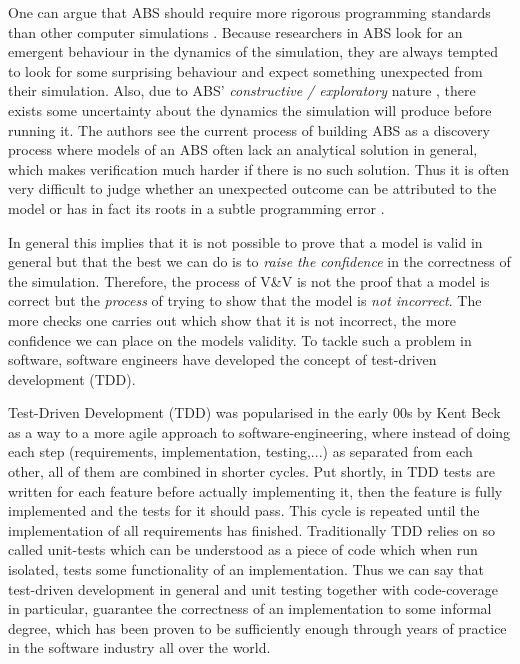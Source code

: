 One can argue that ABS should require more rigorous programming standards than other computer simulations \cite{polhill_ghost_2005}. Because researchers in ABS look for an emergent behaviour in the dynamics of the simulation, they are always tempted to look for some surprising behaviour and expect something unexpected from their simulation. 
Also, due to ABS' \textit{constructive / exploratory} nature \cite{epstein_chapter_2006, epstein_generative_2012}, there exists some uncertainty about the dynamics the simulation will produce before running it. The authors \cite{ormerod_validation_2006} see the current process of building ABS as a discovery process where models of an ABS often lack an analytical solution in general, which makes verification much harder if there is no such solution. Thus it is often very difficult to judge whether an unexpected outcome can be attributed to the model or has in fact its roots in a subtle programming error \cite{galan_errors_2009}.

In general this implies that it is not possible to prove that a model is valid in general but that the best we can do is to \textit{raise the confidence} in the correctness of the simulation. Therefore, the process of V\&V is not the proof that a model is correct but the \textit{process} of trying to show that the model is \textit{not incorrect}. The more checks one carries out which show that it is not incorrect, the more confidence we can place on the models validity. To tackle such a problem in software, software engineers have developed the concept of test-driven development (TDD).

Test-Driven Development (TDD) was popularised in the early 00s by Kent Beck \cite{beck_test_2002} as a way to a more agile approach to software-engineering, where instead of doing each step (requirements, implementation, testing,...) as separated from each other, all of them are combined in shorter cycles. Put shortly, in TDD tests are written for each feature before actually implementing it, then the feature is fully implemented and the tests for it should pass. This cycle is repeated until the implementation of all requirements has finished. Traditionally TDD relies on so called unit-tests which can be understood as a piece of code which when run isolated, tests some functionality of an implementation. Thus we can say that test-driven development in general and unit testing together with code-coverage in particular, guarantee the correctness of an implementation to some informal degree, which has been proven to be sufficiently enough through years of practice in the software industry all over the world. 

